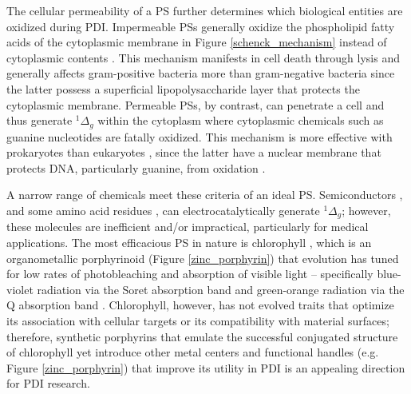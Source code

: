 The cellular permeability of a PS further determines which biological entities are oxidized during PDI. Impermeable PSs generally oxidize the phospholipid fatty acids of the cytoplasmic membrane \cite{Specht1990DepolarizationAction,Ehrenberg1993ElectricAlterations} in Figure \ref{schenck_mechanism} instead of cytoplasmic contents \cite{Maisch2004AntibacterialDermatology}. This mechanism manifests in cell death through lysis \cite{Sahu2009AtomicColi,Bertoloni1987RoleCells} and generally affects gram-positive bacteria more than gram-negative bacteria \cite{Lauro2002PhotoinactivationConjugates,Merchat1996Meso-substitutedBacteria} since the latter possess a superficial lipopolysaccharide layer that protects the cytoplasmic membrane. Permeable PSs, by contrast, can penetrate a cell and thus generate $^1\Delta_g$ within the cytoplasm where cytoplasmic chemicals \cite{Bagchi1979RoleAcriflavine} such as guanine nucleotides \cite{Prat1997Determination9,Devasagayam1991FormationOxygen} are fatally oxidized. This mechanism is more effective with prokaryotes than eukaryotes \cite{Quishida2016PhotodynamicLight}, since the latter have a nuclear membrane that protects DNA, particularly guanine, from oxidation \cite{Pereira2013PhotodynamicVitro}.

A narrow range of chemicals meet these criteria of an ideal PS. Semiconductors \cite{Nelson2002PhotoconductivityDioxide,Peiro2006PhotochemicalPreparations,Linsebigler1995PhotocatalysisResults}, and some amino acid residues \cite{Lippincott-schwartz2003PhotobleachingTechniques,Jin1995PhotolysisSolution}, can electrocatalytically generate $^1\Delta_g$; however, these molecules are inefficient and/or impractical, particularly for medical applications. The most efficacious PS in nature is chlorophyll \cite{Ramel2012ChemicalPlants}, which is an organometallic porphyrinoid (Figure \ref{zinc_porphyrin}) that evolution has tuned for low rates of photobleaching and absorption of visible light -- specifically blue-violet radiation \cite{Mtangi2017ControlSplitting} via the Soret absorption band \cite{Carre1999FungicidalCerevisiae,Pereira2014InfluencePorphyrin,Ashkenazi2003PhotodynamicBacteria,Moan1986PorphyrinShGroups,Nitzan1992InactivationPorphyrins,Durantini2006PhotodynamicBacteria,Salmon-Divon2004MechanisticTetra-mesoN-methylpyridylporphine} and green-orange radiation \cite{Bertoloni2000PhotosensitizingCells} via the Q absorption band \cite{Bonnett1999PhotobleachingStudy,Jori2006PhotodynamicApplications,Gad2004TargetedMice,Zhao2019Porphyrin-basedAbsorption}. Chlorophyll, however, has not evolved traits that optimize its association with cellular targets or its compatibility with material surfaces; therefore, synthetic porphyrins \cite{Orenstein1997TheInfections,Beirao2014PhotodynamicPorphyrin,Merchat1996StudiesPorphyrins} that emulate the successful conjugated structure \cite{Huang2008Porphyrin-dithienothiopheneCells} of chlorophyll yet introduce other metal centers \cite{Mosinger1997QuantumPorphine} and functional handles  \cite{Hirao1999TheoreticalDerivatives,Wu2014BODIPY-basedSolution,Chacon1988SingletArachidonic} (e.g. Figure \ref{zinc_porphyrin}) that improve its utility in PDI \cite{Jager2016QScales,Karolczak2004PhotophysicalTetraphenylporphyrin,Mathai2007SingletTherapy} is an appealing direction for PDI research. 

